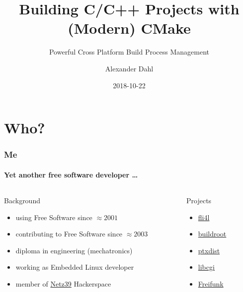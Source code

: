 \documentclass{beamer}
\title[CMake]{Building C/C++ Projects with (Modern) CMake}
\subtitle{Powerful Cross Platform Build Process Management}
\author{Alexander Dahl}
\institute[lespocky.de]{\url{http://www.lespocky.de/}}
\date{2018-10-22}
\begin{document}
\begin{frame}
    \titlepage
\end{frame}



\section*{Who?}

\begin{frame}
    \frametitle{Me}
    \framesubtitle{Yet another free software developer \dots}

    \begin{columns}[T]
        \begin{column}{0.7\textwidth}
            \begin{block}{Background}
                \begin{itemize}
                    \item using Free Software since $\approx 2001$
                    \item contributing to Free Software since $\approx 2003$
                    \item diploma in engineering (mechatronics)
                    \item working as Embedded Linux developer
                    \item member of \href{http://www.netz39.de/}{Netz39} Hackerspace
                \end{itemize}
            \end{block}
        \end{column}
        \pause
        \begin{column}{0.3\textwidth}
            \begin{block}{Projects}
                \begin{itemize}
                    \item \href{https://www.fli4l.de/}{fli4l}
                    \item \href{https://buildroot.org/}{buildroot}
                    \item \href{https://ptxdist.org/}{ptxdist}
                    \item \href{https://github.com/rafaelsteil/libcgi}{libcgi}
                    \item \href{https://freifunk.net/}{Freifunk}
                \end{itemize}
            \end{block}
        \end{column}
    \end{columns}
\end{frame}
\end{document}
